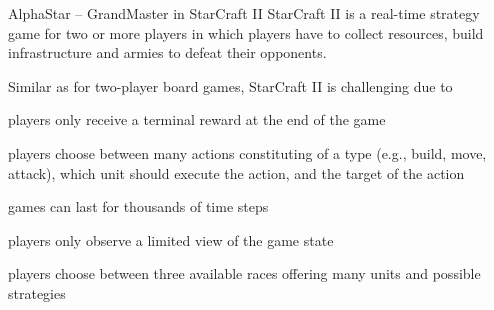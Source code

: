 \begin{frame}[t]{AlphaStar -- GrandMaster in StarCraft II}
    StarCraft II is a real-time strategy game for two or more players in which players have to collect resources, build infrastructure and armies to defeat their opponents.


    \pause

    Similar as for two-player board games, StarCraft II is challenging due to
    \blist
        \item<2->  players only receive a terminal reward at the end of the game
        \item<2->  players choose between many actions constituting of a type (e.g., build, move, attack), which unit should execute the action, and the target of the action
        \item<2->  games can last for thousands of time steps
        \item<3->  players only observe a limited view of the game state
        \item<3->  players choose between three available races offering many units and possible strategies
    \elist
\end{frame}


